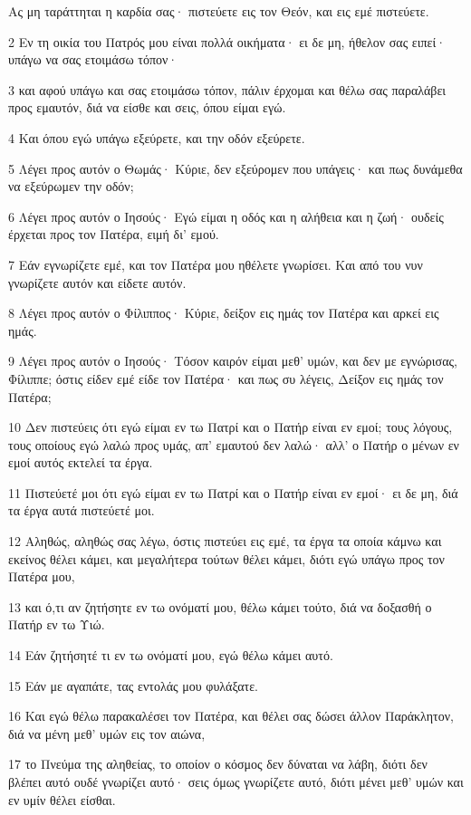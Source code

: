 \par Ας μη ταράττηται η καρδία σας· πιστεύετε εις τον Θεόν, και εις εμέ πιστεύετε.
\par 2 Εν τη οικία του Πατρός μου είναι πολλά οικήματα· ει δε μη, ήθελον σας ειπεί· υπάγω να σας ετοιμάσω τόπον·
\par 3 και αφού υπάγω και σας ετοιμάσω τόπον, πάλιν έρχομαι και θέλω σας παραλάβει προς εμαυτόν, διά να είσθε και σεις, όπου είμαι εγώ.
\par 4 Και όπου εγώ υπάγω εξεύρετε, και την οδόν εξεύρετε.
\par 5 Λέγει προς αυτόν ο Θωμάς· Κύριε, δεν εξεύρομεν που υπάγεις· και πως δυνάμεθα να εξεύρωμεν την οδόν;
\par 6 Λέγει προς αυτόν ο Ιησούς· Εγώ είμαι η οδός και η αλήθεια και η ζωή· ουδείς έρχεται προς τον Πατέρα, ειμή δι' εμού.
\par 7 Εάν εγνωρίζετε εμέ, και τον Πατέρα μου ηθέλετε γνωρίσει. Και από του νυν γνωρίζετε αυτόν και είδετε αυτόν.
\par 8 Λέγει προς αυτόν ο Φίλιππος· Κύριε, δείξον εις ημάς τον Πατέρα και αρκεί εις ημάς.
\par 9 Λέγει προς αυτόν ο Ιησούς· Τόσον καιρόν είμαι μεθ' υμών, και δεν με εγνώρισας, Φίλιππε; όστις είδεν εμέ είδε τον Πατέρα· και πως συ λέγεις, Δείξον εις ημάς τον Πατέρα;
\par 10 Δεν πιστεύεις ότι εγώ είμαι εν τω Πατρί και ο Πατήρ είναι εν εμοί; τους λόγους, τους οποίους εγώ λαλώ προς υμάς, απ' εμαυτού δεν λαλώ· αλλ' ο Πατήρ ο μένων εν εμοί αυτός εκτελεί τα έργα.
\par 11 Πιστεύετέ μοι ότι εγώ είμαι εν τω Πατρί και ο Πατήρ είναι εν εμοί· ει δε μη, διά τα έργα αυτά πιστεύετέ μοι.
\par 12 Αληθώς, αληθώς σας λέγω, όστις πιστεύει εις εμέ, τα έργα τα οποία κάμνω και εκείνος θέλει κάμει, και μεγαλήτερα τούτων θέλει κάμει, διότι εγώ υπάγω προς τον Πατέρα μου,
\par 13 και ό,τι αν ζητήσητε εν τω ονόματί μου, θέλω κάμει τούτο, διά να δοξασθή ο Πατήρ εν τω Υιώ.
\par 14 Εάν ζητήσητέ τι εν τω ονόματί μου, εγώ θέλω κάμει αυτό.
\par 15 Εάν με αγαπάτε, τας εντολάς μου φυλάξατε.
\par 16 Και εγώ θέλω παρακαλέσει τον Πατέρα, και θέλει σας δώσει άλλον Παράκλητον, διά να μένη μεθ' υμών εις τον αιώνα,
\par 17 το Πνεύμα της αληθείας, το οποίον ο κόσμος δεν δύναται να λάβη, διότι δεν βλέπει αυτό ουδέ γνωρίζει αυτό· σεις όμως γνωρίζετε αυτό, διότι μένει μεθ' υμών και εν υμίν θέλει είσθαι.

